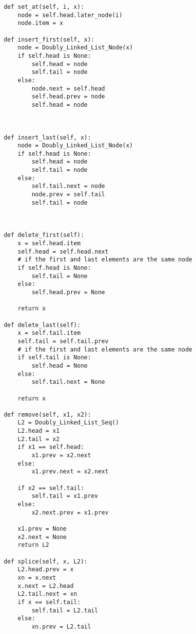 \documentclass[12pt,twoside]{article}
\begin{document}
\begin{problems}
\begin{problemparts}
\begin{lstlisting}
    def set_at(self, i, x):
        node = self.head.later_node(i)
        node.item = x

    def insert_first(self, x):
        node = Doubly_Linked_List_Node(x)
        if self.head is None:
            self.head = node
            self.tail = node
        else:
            node.next = self.head
            self.head.prev = node
            self.head = node
            


    def insert_last(self, x):
        node = Doubly_Linked_List_Node(x)
        if self.head is None:
            self.head = node
            self.tail = node
        else:
            self.tail.next = node
            node.prev = self.tail
            self.tail = node

            

    def delete_first(self):
        x = self.head.item
        self.head = self.head.next
        # if the first and last elements are the same node
        if self.head is None:
            self.tail = None
        else:
            self.head.prev = None

        return x

    def delete_last(self):
        x = self.tail.item
        self.tail = self.tail.prev 
        # if the first and last elements are the same node
        if self.tail is None:
            self.head = None
        else:
            self.tail.next = None

        return x

    def remove(self, x1, x2):
        L2 = Doubly_Linked_List_Seq()
        L2.head = x1
        L2.tail = x2
        if x1 == self.head:
            x1.prev = x2.next
        else:
            x1.prev.next = x2.next

        if x2 == self.tail:
            self.tail = x1.prev
        else:
            x2.next.prev = x1.prev

        x1.prev = None
        x2.next = None
        return L2

    def splice(self, x, L2):
        L2.head.prev = x
        xn = x.next
        x.next = L2.head
        L2.tail.next = xn
        if x == self.tail:
            self.tail = L2.tail
        else:
            xn.prev = L2.tail
\end{lstlisting}
\end{problemparts}

\end{problems}
\end{document}
